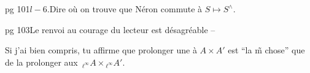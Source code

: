 
\qquad pg 101\qquad $l-6$.\qquad Dire où on trouve que Néron commute à $S\mapsto S^{\wedge}$.

pg 103\qquad Le renvoi au courage du lecteur est désagréable --


Si j'ai bien compris, tu affirme que prolonger une  à $A\times A'$ est ``la \~m chose'' que de la prolonger aux $\,{}_{\ell^\infty}A\times{}_{\ell^\infty}A'$.

